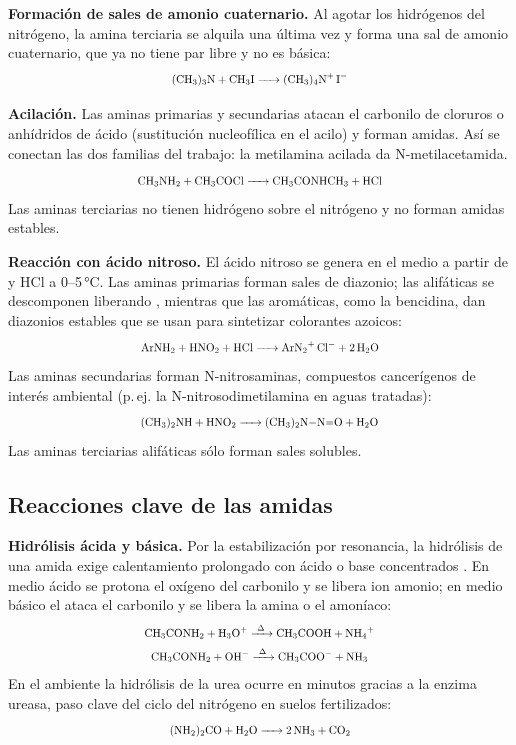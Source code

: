 \textbf{Formación de sales de amonio cuaternario.} Al agotar los hidrógenos
del nitrógeno, la amina terciaria se alquila una última vez y forma una sal
de amonio cuaternario, que ya no tiene par libre y no es básica:
\begin{equation}
	\reac{(CH3)3N + CH3I -> (CH3)4N+ I-}
\end{equation}

\textbf{Acilación.} Las aminas primarias y secundarias atacan el carbonilo
de cloruros o anhídridos de ácido (sustitución nucleofílica en el acilo) y
forman amidas. Así se conectan las dos familias del trabajo: la metilamina
acilada da N-metilacetamida.
\begin{equation}
	\reac{CH3NH2 + CH3COCl -> CH3CONHCH3 + HCl}
\end{equation}
Las aminas terciarias no tienen hidrógeno sobre el nitrógeno y no forman
amidas estables.

\textbf{Reacción con ácido nitroso.} El ácido nitroso se genera en el medio
a partir de  y HCl a 0--5\,\si{\degreeCelsius}. Las aminas
primarias forman sales de diazonio; las alifáticas se descomponen liberando
, mientras que las aromáticas, como la bencidina, dan diazonios
estables que se usan para sintetizar colorantes azoicos:
\begin{equation}
	\reac{ArNH2 + HNO2 + HCl -> ArN2+ Cl- + 2H2O}
\end{equation}
Las aminas secundarias forman N-nitrosaminas, compuestos cancerígenos de
interés ambiental (p.\,ej. la N-nitrosodimetilamina en aguas tratadas):
\begin{equation}
	\reac{(CH3)2NH + HNO2 -> (CH3)2N-N=O + H2O}
\end{equation}
Las aminas terciarias alifáticas sólo forman sales solubles.

\subsection{Reacciones clave de las amidas}
\label{sec:reac-amidas}
\textbf{Hidrólisis ácida y básica.} Por la estabilización por resonancia, la
hidrólisis de una amida exige calentamiento prolongado con ácido o base
concentrados \cite{wade2017}. En medio ácido se protona el oxígeno del
carbonilo y se libera ion amonio; en medio básico el  ataca el
carbonilo y se libera la amina o el amoníaco:
\begin{gather}
	\reac{CH3CONH2 + H3O+ ->[\Delta] CH3COOH + NH4+}\\
	\reac{CH3CONH2 + OH- ->[\Delta] CH3COO- + NH3}
\end{gather}
En el ambiente la hidrólisis de la urea ocurre en minutos gracias a la
enzima ureasa, paso clave del ciclo del nitrógeno en suelos fertilizados:
\begin{equation}
	\reac{(NH2)2CO + H2O -> 2NH3 + CO2}
\end{equation}

